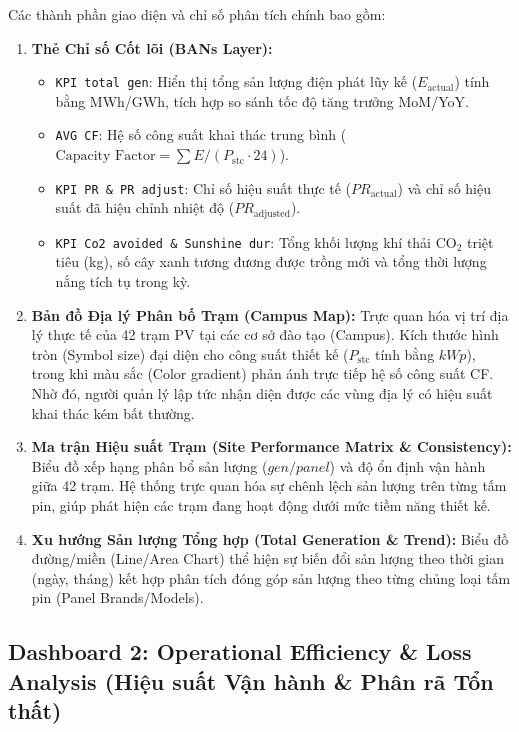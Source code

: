 \documentclass[12pt, a4paper]{report}
\begin{document}
Các thành phần giao diện và chỉ số phân tích chính bao gồm:
\begin{enumerate}[label=\alph*., leftmargin=*]
    \item \textbf{Thẻ Chỉ số Cốt lõi (BANs Layer):}
    \begin{itemize}
        \item \texttt{KPI total gen}: Hiển thị tổng sản lượng điện phát lũy kế ($E_{\text{actual}}$) tính bằng MWh/GWh, tích hợp so sánh tốc độ tăng trưởng MoM/YoY.
        \item \texttt{AVG CF}: Hệ số công suất khai thác trung bình ($\text{Capacity Factor} = \sum E / (P_{\text{stc}} \cdot 24)$).
        \item \texttt{KPI PR \& PR adjust}: Chỉ số hiệu suất thực tế ($PR_{\text{actual}}$) và chỉ số hiệu suất đã hiệu chỉnh nhiệt độ ($PR_{\text{adjusted}}$).
        \item \texttt{KPI Co2 avoided \& Sunshine dur}: Tổng khối lượng khí thải $\text{CO}_2$ triệt tiêu (kg), số cây xanh tương đương được trồng mới và tổng thời lượng nắng tích tụ trong kỳ.
    \end{itemize}

    \item \textbf{Bản đồ Địa lý Phân bố Trạm (Campus Map):}
    Trực quan hóa vị trí địa lý thực tế của 42 trạm PV tại các cơ sở đào tạo (Campus). Kích thước hình tròn (Symbol size) đại diện cho công suất thiết kế ($P_{\text{stc}}$ tính bằng $kWp$), trong khi màu sắc (Color gradient) phản ánh trực tiếp hệ số công suất CF. Nhờ đó, người quản lý lập tức nhận diện được các vùng địa lý có hiệu suất khai thác kém bất thường.

    \item \textbf{Ma trận Hiệu suất Trạm (Site Performance Matrix \& Consistency):}
    Biểu đồ xếp hạng phân bổ sản lượng ($gen/panel$) và độ ổn định vận hành giữa 42 trạm. Hệ thống trực quan hóa sự chênh lệch sản lượng trên từng tấm pin, giúp phát hiện các trạm đang hoạt động dưới mức tiềm năng thiết kế.

    \item \textbf{Xu hướng Sản lượng Tổng hợp (Total Generation \& Trend):}
    Biểu đồ đường/miền (Line/Area Chart) thể hiện sự biến đổi sản lượng theo thời gian (ngày, tháng) kết hợp phân tích đóng góp sản lượng theo từng chủng loại tấm pin (Panel Brands/Models).
\end{enumerate}

\subsection{Dashboard 2: Operational Efficiency \& Loss Analysis (Hiệu suất Vận hành \& Phân rã Tổn thất)}
\label{subsec:db_efficiency}
\end{document}
